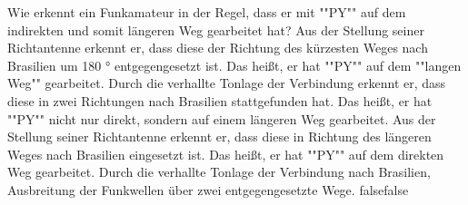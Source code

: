     {Wie erkennt ein Funkamateur in der Regel, dass er mit ""PY"" auf dem indirekten und somit längeren Weg gearbeitet hat?}
    {Aus der Stellung seiner Richtantenne erkennt er, dass diese der Richtung des kürzesten Weges nach Brasilien um 180 ° entgegengesetzt ist. Das heißt, er hat ""PY"" auf dem ""langen Weg"" gearbeitet.}
    {Durch die verhallte Tonlage der Verbindung erkennt er, dass diese in zwei Richtungen nach Brasilien stattgefunden hat. Das heißt, er hat ""PY"" nicht nur direkt, sondern auf einem längeren Weg gearbeitet.}
    {Aus der Stellung seiner Richtantenne erkennt er, dass diese in Richtung des längeren Weges nach Brasilien eingesetzt ist. Das heißt, er hat ""PY"" auf dem direkten Weg gearbeitet.}
    {Durch die verhallte Tonlage der Verbindung nach Brasilien, Ausbreitung der Funkwellen über zwei entgegengesetzte Wege.}
    {false}{false}